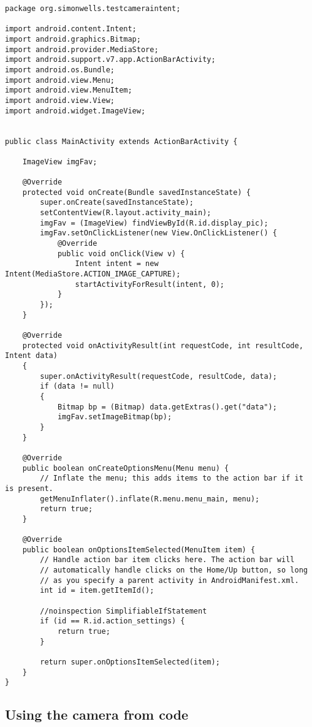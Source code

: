 \begin{lstlisting}
package org.simonwells.testcameraintent;

import android.content.Intent;
import android.graphics.Bitmap;
import android.provider.MediaStore;
import android.support.v7.app.ActionBarActivity;
import android.os.Bundle;
import android.view.Menu;
import android.view.MenuItem;
import android.view.View;
import android.widget.ImageView;


public class MainActivity extends ActionBarActivity {

    ImageView imgFav;

    @Override
    protected void onCreate(Bundle savedInstanceState) {
        super.onCreate(savedInstanceState);
        setContentView(R.layout.activity_main);
        imgFav = (ImageView) findViewById(R.id.display_pic);
        imgFav.setOnClickListener(new View.OnClickListener() {
            @Override
            public void onClick(View v) {
                Intent intent = new Intent(MediaStore.ACTION_IMAGE_CAPTURE);
                startActivityForResult(intent, 0);
            }
        });
    }

    @Override
    protected void onActivityResult(int requestCode, int resultCode, Intent data)
    {
        super.onActivityResult(requestCode, resultCode, data);
        if (data != null)
        {
            Bitmap bp = (Bitmap) data.getExtras().get("data");
            imgFav.setImageBitmap(bp);
        }
    }

    @Override
    public boolean onCreateOptionsMenu(Menu menu) {
        // Inflate the menu; this adds items to the action bar if it is present.
        getMenuInflater().inflate(R.menu.menu_main, menu);
        return true;
    }

    @Override
    public boolean onOptionsItemSelected(MenuItem item) {
        // Handle action bar item clicks here. The action bar will
        // automatically handle clicks on the Home/Up button, so long
        // as you specify a parent activity in AndroidManifest.xml.
        int id = item.getItemId();

        //noinspection SimplifiableIfStatement
        if (id == R.id.action_settings) {
            return true;
        }

        return super.onOptionsItemSelected(item);
    }
}
\end{lstlisting}

\subsection{Using the camera from code}

